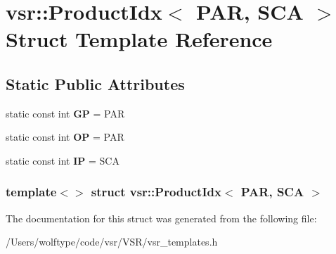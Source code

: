 \hypertarget{structvsr_1_1_product_idx_3_01_p_a_r_00_01_s_c_a_01_4}{\section{vsr\-:\-:Product\-Idx$<$ P\-A\-R, S\-C\-A $>$ Struct Template Reference}
\label{structvsr_1_1_product_idx_3_01_p_a_r_00_01_s_c_a_01_4}
}
\subsection*{Static Public Attributes}
\begin{DoxyCompactItemize}
\item 
\hypertarget{structvsr_1_1_product_idx_3_01_p_a_r_00_01_s_c_a_01_4_ab8384f4ca0c7bcdc2f1b1fe7fb6ad694}{static const int {\bfseries G\-P} = P\-A\-R}\label{structvsr_1_1_product_idx_3_01_p_a_r_00_01_s_c_a_01_4_ab8384f4ca0c7bcdc2f1b1fe7fb6ad694}

\item 
\hypertarget{structvsr_1_1_product_idx_3_01_p_a_r_00_01_s_c_a_01_4_ae9e4027884bd92554cde7fcdfbd23b16}{static const int {\bfseries O\-P} = P\-A\-R}\label{structvsr_1_1_product_idx_3_01_p_a_r_00_01_s_c_a_01_4_ae9e4027884bd92554cde7fcdfbd23b16}

\item 
\hypertarget{structvsr_1_1_product_idx_3_01_p_a_r_00_01_s_c_a_01_4_a545d258b3cfe89d53e9e8373c3bc8ae9}{static const int {\bfseries I\-P} = S\-C\-A}\label{structvsr_1_1_product_idx_3_01_p_a_r_00_01_s_c_a_01_4_a545d258b3cfe89d53e9e8373c3bc8ae9}

\end{DoxyCompactItemize}
\subsubsection*{template$<$$>$ struct vsr\-::\-Product\-Idx$<$ P\-A\-R, S\-C\-A $>$}



The documentation for this struct was generated from the following file\-:\begin{DoxyCompactItemize}
\item 
/\-Users/wolftype/code/vsr/\-V\-S\-R/vsr\-\_\-templates.\-h\end{DoxyCompactItemize}
